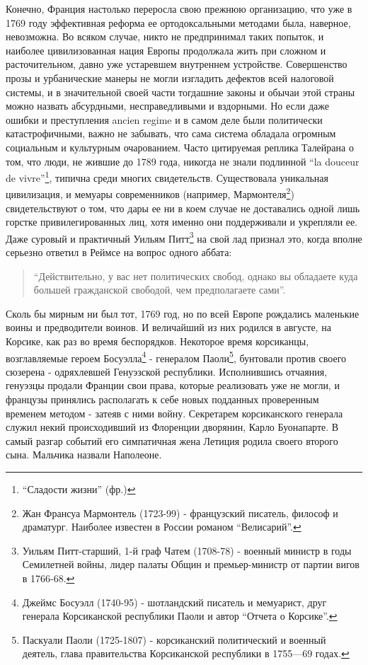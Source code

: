 \documentclass[
  oneside,
  12pt,
  titlepage]{book}
\begin{document}
Конечно, Франция настолько переросла свою прежнюю организацию, что уже в 1769 году эффективная реформа ее ортодоксальными методами была, наверное, невозможна. Во всяком случае, никто не предпринимал таких попыток, и наиболее цивилизованная нация Европы продолжала жить при сложном и расточительном, давно уже устаревшем внутреннем устройстве. Совершенство прозы и урбанические манеры не могли изгладить дефектов всей налоговой системы, и в значительной своей части тогдашние законы и обычаи этой страны можно назвать абсурдными, несправедливыми и вздорными. Но если даже ошибки и преступления ancien regime и в самом деле были политически катастрофичными, важно не забывать, что сама система обладала огромным социальным и культурным очарованием. Часто цитируемая реплика Талейрана о том, что люди, не жившие до 1789 года, никогда не знали подлинной ``la douceur de vivre''\footnote{``Сладости жизни'' (фр.)}, типична среди многих свидетельств. Существовала уникальная цивилизация, и мемуары современников (например, Мармонтеля\footnote{Жан Франсуа Мармонтель (1723-99) - французский писатель, философ и драматург. Наиболее известен в России романом ``Велисарий''.}) свидетельствуют о том, что дары ее ни в коем случае не доставались одной лишь горстке привилегированных лиц, хотя именно они поддерживали и укрепляли ее. Даже суровый и практичный Уильям Питт\footnote{Уильям Питт-старший, 1-й граф Чатем (1708-78) - военный министр в годы Семилетней войны, лидер палаты Общин и премьер-министр от партии вигов в 1766-68.} на свой лад признал это, когда вполне серьезно ответил в Реймсе на вопрос одного аббата:

\begin{quote}
``Действительно, у вас нет политических свобод, однако вы обладаете куда большей гражданской свободой, чем предполагаете сами''.
\end{quote}

Сколь бы мирным ни был тот, 1769 год, но по всей Европе рождались маленькие воины и предводители воинов. И величайший из них родился в августе, на Корсике, как раз во время беспорядков. Некоторое время корсиканцы, возглавляемые героем Босуэлла\footnote{Джеймс Босуэлл (1740-95) - шотландский писатель и мемуарист, друг генерала Корсиканской республики Паоли и автор ``Отчета о Корсике''.} - генералом Паоли\footnote{Паскуали Паоли (1725-1807) - корсиканский политический и военный деятель, глава правительства Корсиканской республики в 1755---69 годах.}, бунтовали против своего сюзерена - одряхлевшей Генуэзской республики. Исполнившись отчаяния, генуэзцы продали Франции свои права, которые реализовать уже не могли, и французы принялись располагать к себе новых подданных проверенным временем методом - затеяв с ними войну. Секретарем корсиканского генерала служил некий происходивший из Флоренции дворянин, Карло Буонапарте. В самый разгар событий его симпатичная жена Летиция родила своего второго сына. Мальчика назвали Наполеоне.
\end{document}
